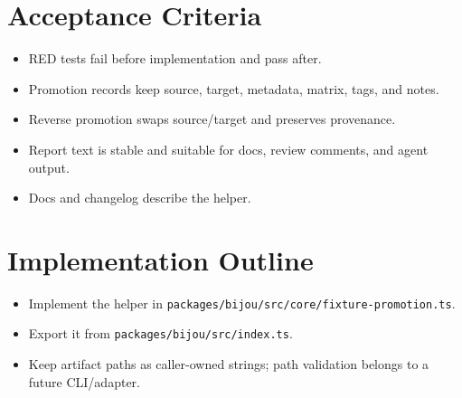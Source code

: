 \section{Acceptance Criteria}\label{record-090-acceptance-criteria}

\begin{itemize}
\tightlist
\item
  RED tests fail before implementation and pass after.
\item
  Promotion records keep source, target, metadata, matrix, tags, and notes.
\item
  Reverse promotion swaps source/target and preserves provenance.
\item
  Report text is stable and suitable for docs, review comments, and agent output.
\item
  Docs and changelog describe the helper.
\end{itemize}

\section{Implementation Outline}\label{record-090-implementation-outline}

\begin{itemize}
\tightlist
\item
  Implement the helper in \texttt{p\allowbreak{}a\allowbreak{}c\allowbreak{}k\allowbreak{}a\allowbreak{}g\allowbreak{}e\allowbreak{}s\allowbreak{}/\allowbreak{}b\allowbreak{}i\allowbreak{}j\allowbreak{}o\allowbreak{}u\allowbreak{}/\allowbreak{}s\allowbreak{}r\allowbreak{}c\allowbreak{}/\allowbreak{}c\allowbreak{}o\allowbreak{}r\allowbreak{}e\allowbreak{}/\allowbreak{}f\allowbreak{}i\allowbreak{}x\allowbreak{}t\allowbreak{}u\allowbreak{}r\allowbreak{}e\allowbreak{}-\allowbreak{}p\allowbreak{}r\allowbreak{}o\allowbreak{}m\allowbreak{}o\allowbreak{}t\allowbreak{}i\allowbreak{}o\allowbreak{}n\allowbreak{}.\allowbreak{}t\allowbreak{}s}.
\item
  Export it from \texttt{p\allowbreak{}a\allowbreak{}c\allowbreak{}k\allowbreak{}a\allowbreak{}g\allowbreak{}e\allowbreak{}s\allowbreak{}/\allowbreak{}b\allowbreak{}i\allowbreak{}j\allowbreak{}o\allowbreak{}u\allowbreak{}/\allowbreak{}s\allowbreak{}r\allowbreak{}c\allowbreak{}/\allowbreak{}i\allowbreak{}n\allowbreak{}d\allowbreak{}e\allowbreak{}x\allowbreak{}.\allowbreak{}t\allowbreak{}s}.
\item
  Keep artifact paths as caller-owned strings; path validation belongs to a future CLI/adapter.
\end{itemize}


